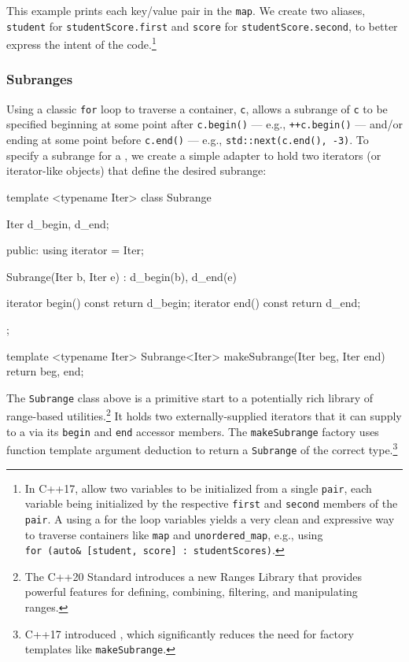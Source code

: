 {{\noindent This example prints each key/value pair in the \lstinline!map!. We create
two aliases, \lstinline!student! for \lstinline!studentScore.first! and
\lstinline!score! for \lstinline!studentScore.second!, to better express the
intent of the code.{\cprotect\footnote{In C++17,  allow two variables to be initialized from a single
\lstinline!pair!, each variable being initialized by the respective
\lstinline!first! and \lstinline!second! members of the \lstinline!pair!. A
 using a  for the loop variables yields a very clean and expressive way
to traverse containers like \lstinline!map! and \lstinline!unordered_map!,
e.g., using
  \lstinline!for!~\lstinline!(auto&!~\lstinline![student,!~\lstinline!score]!~\lstinline!:!~\lstinline!studentScores)!.}}

\subsubsection[Subranges]{Subranges}\label{subranges}

Using a classic \lstinline!for! loop to traverse a container, \lstinline!c!,
allows a subrange of \lstinline!c! to be specified beginning at some point
after \lstinline!c.begin()! --- e.g., \lstinline!++c.begin()! --- and/or ending at
some point before \lstinline!c.end()! --- e.g.,
\lstinline!std::next(c.end(),!~\lstinline!-3)!. To specify a subrange for a
, we create a simple adapter to
hold two iterators (or iterator-like objects) that define the desired
subrange:

\begin{emcppslisting}
template <typename Iter>
class Subrange
{
    Iter d_begin, d_end;

public:
    using iterator = Iter;

    Subrange(Iter b, Iter e) : d_begin(b), d_end(e) { }

    iterator begin() const { return d_begin; }
    iterator end()   const { return d_end;   }
};

template <typename Iter>
Subrange<Iter> makeSubrange(Iter beg, Iter end) { return {beg, end}; }
\end{emcppslisting}
    

\noindent The \lstinline!Subrange! class above is a primitive start to a potentially
rich library of range-based utilities.{\cprotect\footnote{The C++20
Standard introduces a new Ranges Library that provides powerful
  features for defining, combining, filtering, and manipulating ranges.}}
It holds two externally-supplied iterators that it can supply to a
 via its \lstinline!begin! and
\lstinline!end! accessor members. The \lstinline!makeSubrange! factory uses
function template argument deduction to return a \lstinline!Subrange! of
the correct type.{\cprotect\footnote{C++17 introduced , which significantly reduces the need for
  factory templates like \lstinline!makeSubrange!.}}

}}
